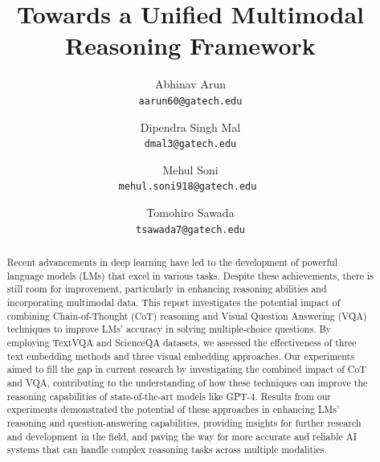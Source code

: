 \documentclass[10pt,twocolumn,letterpaper]{article}
\begin{document}
\title{Towards a Unified Multimodal Reasoning Framework %
}

\author{Abhinav Arun\\
{\tt\small aarun60@gatech.edu}\\
\and
Dipendra Singh Mal\\
{\tt\small dmal3@gatech.edu}\\
\and
Mehul Soni\\
{\tt\small mehul.soni918@gatech.edu}\
\and
Tomohiro Sawada\\
{\tt\small tsawada7@gatech.edu}\\
}

\maketitle

\begin{abstract}
   Recent advancements in deep learning have led to the development of powerful language models (LMs) that excel in various tasks. Despite these achievements, there is still room for improvement, particularly in enhancing reasoning abilities and incorporating multimodal data. This report investigates the potential impact of combining Chain-of-Thought (CoT) reasoning and Visual Question Answering (VQA) techniques to improve LMs' accuracy in solving multiple-choice questions. By employing TextVQA and ScienceQA datasets, we assessed the effectiveness of three text embedding methods and three visual embedding approaches. Our experiments aimed to fill the gap in current research by investigating the combined impact of CoT and VQA, contributing to the understanding of how these techniques can improve the reasoning capabilities of state-of-the-art models like GPT-4. Results from our experiments demonstrated the potential of these approaches in enhancing LMs' reasoning and question-answering capabilities, providing insights for further research and development in the field, and paving the way for more accurate and reliable AI systems that can handle complex reasoning tasks across multiple modalities.
\end{abstract}
\end{document}
